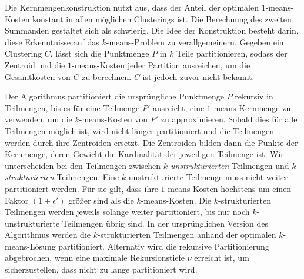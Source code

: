 Die Kernmengenkonstruktion nutzt aus, dass der Anteil der optimalen $1$-means-Kosten konstant in allen möglichen
Clusterings ist. Die Berechnung des zweiten Summanden gestaltet sich als schwierig. Die Idee der Konstruktion besteht darin, diese
Erkenntnisse auf das $k$-means-Problem zu verallgemeinern. Gegeben ein Clustering $C$, lässt sich die Punktmenge $P$ in
$k$ Teile partitionieren, sodass der Zentroid und die $1$-means-Kosten jeder Partition ausreichen, um die Gesamtkosten von $C$
zu berechnen. $C$ ist jedoch zuvor nicht bekannt.

Der Algorithmus partitioniert die ursprüngliche Punktmenge $P$ rekursiv in Teilmengen, bis es für eine Teilmenge $P'$ ausreicht,
eine $1$-means-Kernmenge zu verwenden, um die $k$-means-Kosten von $P'$ zu approximieren. Sobald dies für alle Teilmengen
möglich ist, wird nicht länger partitioniert und die Teilmengen werden durch ihre Zentroiden ersetzt. Die Zentroiden bilden
dann die Punkte der Kernmenge, deren Gewicht die Kardinalität der jeweiligen Teilmenge ist. Wir unterscheiden bei den
Teilmengen zwischen \emph{$k$-unstrukturierten} Teilmengen und \emph{$k$-strukturierten} Teilmengen. Eine $k$-unstrukturierte
Teilmenge muss nicht weiter partitioniert werden. Für sie gilt, dass ihre $1$-means-Kosten höchstens um einen Faktor
$(1+\epsilon')$ größer sind als die $k$-means-Kosten. Die $k$-strukturierten Teilmengen werden jeweils solange weiter
partitioniert, bis nur noch $k$-unstrukturierte Teilmengen übrig sind. In der ursprünglichen Version des Algorithmus werden
die $k$-strukturierten Teilmengen anhand der optimalen $k$-means-Lösung partitioniert. Alternativ wird die rekursive
Partitionierung abgebrochen, wenn eine maximale Rekursionstiefe $\nu$ erreicht ist, um sicherzustellen, dass nicht zu lange
partitioniert wird.

